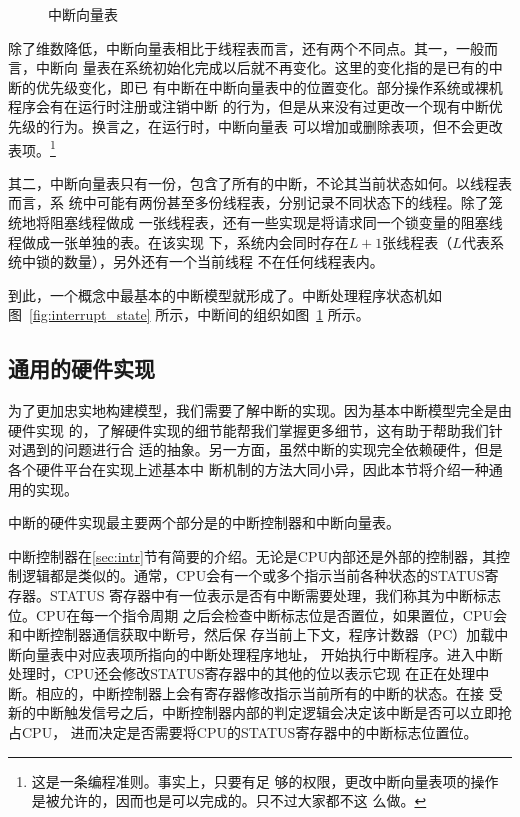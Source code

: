 \begin{figure}[H]
	\centering
	
	\caption{中断向量表}
	\label{fig:interrupt_vector_table}
\end{figure}

除了维数降低，中断向量表相比于线程表而言，还有两个不同点。其一，一般而言，中断向
量表在系统初始化完成以后就不再变化。这里的变化指的是已有的中断的优先级变化，即已
有中断在中断向量表中的位置变化。部分操作系统或裸机程序会有在运行时注册或注销中断
的行为，但是从来没有过更改一个现有中断优先级的行为。换言之，在运行时，中断向量表
可以增加或删除表项，但不会更改表项。\footnote{这是一条编程准则。事实上，只要有足
够的权限，更改中断向量表项的操作是被允许的，因而也是可以完成的。只不过大家都不这
么做。}

其二，中断向量表只有一份，包含了所有的中断，不论其当前状态如何。以线程表而言，系
统中可能有两份甚至多份线程表，分别记录不同状态下的线程。除了笼统地将阻塞线程做成
一张线程表，还有一些实现是将请求同一个锁变量的阻塞线程做成一张单独的表。在该实现
下，系统内会同时存在$L+1$张线程表（$L$代表系统中锁的数量），另外还有一个当前线程
不在任何线程表内。

到此，一个概念中最基本的中断模型就形成了。中断处理程序状态机如图~\ref{fig:interrupt_state} 
所示，中断间的组织如图~\ref{fig:interrupt_vector_table} 所示。

\subsection{通用的硬件实现}
\label{subsec:basic_hardware}

为了更加忠实地构建模型，我们需要了解中断的实现。因为基本中断模型完全是由硬件实现
的，了解硬件实现的细节能帮我们掌握更多细节，这有助于帮助我们针对遇到的问题进行合
适的抽象。另一方面，虽然中断的实现完全依赖硬件，但是各个硬件平台在实现上述基本中
断机制的方法大同小异，因此本节将介绍一种通用的实现。

中断的硬件实现最主要两个部分是的中断控制器和中断向量表。

中断控制器在\ref{sec:intr}节有简要的介绍。无论是CPU内部还是外部的控制器，其控
制逻辑都是类似的。通常，CPU会有一个或多个指示当前各种状态的STATUS寄存器。STATUS
寄存器中有一位表示是否有中断需要处理，我们称其为中断标志位。CPU在每一个指令周期
之后会检查中断标志位是否置位，如果置位，CPU会和中断控制器通信获取中断号，然后保
存当前上下文，程序计数器（PC）加载中断向量表中对应表项所指向的中断处理程序地址，
开始执行中断程序。进入中断处理时，CPU还会修改STATUS寄存器中的其他的位以表示它现
在正在处理中断。相应的，中断控制器上会有寄存器修改指示当前所有的中断的状态。在接
受新的中断触发信号之后，中断控制器内部的判定逻辑会决定该中断是否可以立即抢占CPU，
进而决定是否需要将CPU的STATUS寄存器中的中断标志位置位。

